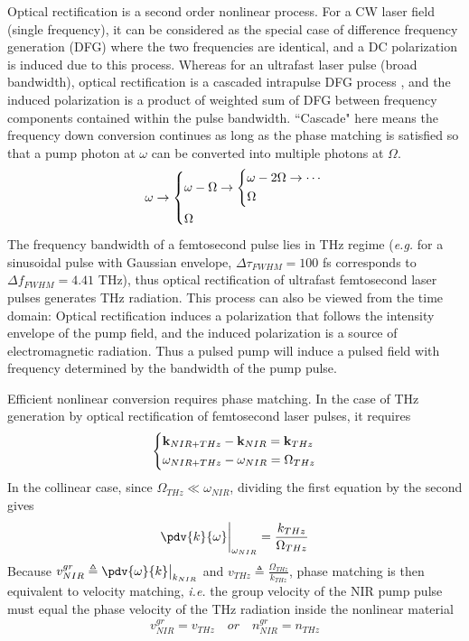 Optical rectification is a second order nonlinear process. For a CW laser field (single frequency), it can be considered as the special case of difference frequency generation (DFG) where the two frequencies are identical, and a DC polarization is induced due to this process. Whereas for an ultrafast laser pulse (broad bandwidth), optical rectification is a cascaded intrapulse DFG process \cite{ORcascade}, and the induced polarization is a product of weighted sum of DFG between frequency components contained within the pulse bandwidth. ``Cascade" here means the frequency down conversion continues as long as the phase matching is satisfied so that a pump photon at $\omega$ can be converted into multiple photons at $\Omega$.
\begin{equation}
    \omega \rightarrow 
    \begin{dcases}
        \omega - \Omega \rightarrow
        \begin{dcases}
            \omega - 2 \Omega \rightarrow \cdots\\
            \Omega
        \end{dcases}\\
        \Omega
    \end{dcases} 
\end{equation}
The frequency bandwidth of a femtosecond pulse lies in THz regime ({\it e.g.\@} for a sinusoidal pulse with Gaussian envelope, $\Delta \tau_{FWHM} = 100$ fs corresponds to $\Delta f_{FWHM} = 4.41$ THz), thus optical rectification of ultrafast femtosecond laser pulses generates THz radiation. This process can also be viewed from the time domain: Optical rectification induces a polarization that follows the intensity envelope of the pump field, and the induced polarization is a source of electromagnetic radiation. Thus a pulsed pump will induce a pulsed field with frequency determined by the bandwidth of the pump pulse. 

Efficient nonlinear conversion requires phase matching. In the case of THz generation by optical rectification of femtosecond laser pulses, it requires
\begin{equation}
    \begin{dcases}
        {\bf k}_{NIR+THz} - {\bf k}_{NIR} = {\bf k}_{THz}\\
        \omega_{NIR+THz} - \omega_{NIR} = \Omega_{THz}       
    \end{dcases}
\end{equation}
In the collinear case, since $\Omega_{THz} \ll \omega_{NIR}$, dividing the first equation by the second gives
\begin{equation}
    \pdv{k}{\omega}\bigg|_{\omega_{NIR}} = \frac{k_{THz}}{\Omega_{THz}}
\end{equation}
Because $v_{NIR}^{gr} \triangleq \pdv{\omega}{k}\big|_{k_{NIR}}$ and $v_{THz} \triangleq \frac{\Omega_{THz}}{k_{THz}}$, phase matching is then equivalent to velocity matching, {\it i.e.\@} the group velocity of the NIR pump pulse must equal the phase velocity of the THz radiation inside the nonlinear material \cite{ORNelsonandHebling}
\begin{equation}
    v_{NIR}^{gr} = v_{THz} \quad or \quad n_{NIR}^{gr} = n_{THz}    
\end{equation}

